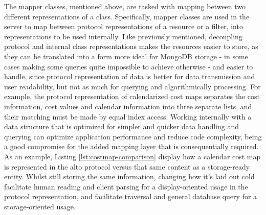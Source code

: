     The mapper classes, mentioned above, are tasked with mapping between two different representations of a class.
    Specifically, mapper classes are used in the server to map between protocol representations of a resource or a filter, into representations to be used internally.
    Like previously mentioned, decoupling protocol and internal class representations makes the resources easier to store, as they can be translated into a form more ideal for MongoDB storage - in some cases making some queries quite impossible to achieve otherwise - and easier to handle, since protocol representation of data is better for data transmission and user readability, but not as much for querying and algorithmically processing.
    For example, the protocol representation of calendarized cost maps separates the cost information, cost values and calendar information into three separate lists, and their matching must be made by equal index access.
    Working internally with a data structure that is optimized for simpler and quicker data handling and querying can optimize application performance and reduce code complexity, being a good compromise for the added mapping layer that is consequentially required.
    As an example, Listing \ref{lst:costmap-comparison} display how a calendar cost map is represented in the \gls{alto} protocol versus that same content as a storage-ready entity.
    Whilst still storing the same information, changing how it's laid out cold facilitate human reading and client parsing for a display-oriented usage in the protocol representation, and facilitate traversal and general database query for a storage-oriented usage.


